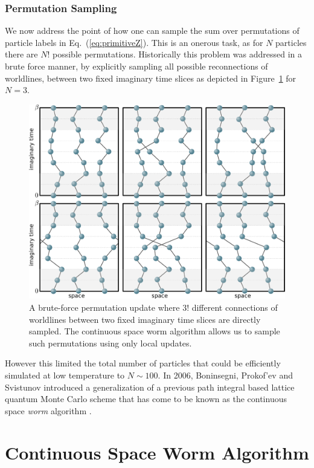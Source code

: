 \documentclass[prb,10pt,aps,floatfix,notitlepage]{revtex4-1}
\renewcommand{\eqref}[1]{Eq.~(\ref{#1})}
\begin{document}
\subsubsection{Permutation Sampling}
We now address the point of how one can sample the sum over permutations of
particle labels in \eqref{eq:primitiveZ}. This is an onerous task, as for $N$
particles there are $N!$ possible permutations.
Historically this problem was addressed in a brute force manner, by explicitly
sampling all possible reconnections of worldlines, between two fixed imaginary
time slices as depicted in Figure~\ref{fig:permute} for $N=3$. 
%
\begin{figure}
\begin{center}
\includegraphics[width=0.70\columnwidth]{Figures/permute.pdf}
\end{center}
\caption{A brute-force permutation update where $3!$ different connections of
    worldlines between two fixed imaginary time slices are
    directly sampled. The continuous space worm algorithm allows us to sample
    such permutations using only local updates.}
\label{fig:permute}
 \end{figure}
%
However this limited the total number of
particles that could be efficiently simulated at low temperature to $N \sim
100$. In 2006, Boninsegni, Prokof'ev and Svistunov introduced a generalization
of a previous path integral based lattice quantum Monte Carlo scheme
\cite{Prokofev:1998ux} that has come to be known as the continuous space
\emph{worm} algorithm \cite{Boninsegni:2006ed,Boninsegni:2006gc}.


\section{Continuous Space Worm Algorithm}
\end{document}
